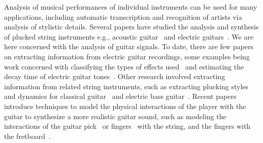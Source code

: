 \documentclass{article}
\begin{document}
Analysis of musical performances of individual instruments can be used for many applications, including automatic transcription and recognition of artists via analysis of stylistic details. Several papers have studied the analysis and synthesis of plucked string instruments e.g., acoustic guitar~\cite{Karjalainen93towardshigh-quality,laurson2001methods} and electric guitars~\cite{sullivan1990extending}. We are here concerned with the analysis of guitar signals. To date, there are few papers on extracting information from electric guitar recordings, some examples being work concerned with classifying the types of effects used~\cite{abesser2012feature} and estimating the decay time of electric guitar tones~\cite{pate2014predicting}. Other research involved extracting information from related string instruments, such as extracting plucking styles and dynamics for classical guitar~\cite{erkut2000extraction} and electric bass guitar~\cite{abesser:automatic_string_detection_ml}. Recent papers introduce techniques to model the physical interactions of the player with the guitar to synthesize a more realistic guitar sound, such as modeling the interactions of the guitar pick~\cite{germain2009synthesis,evangelista2010player} or fingers~\cite{poirot_nonlinear_interactions_with_string} with the string, and the fingers with the fretboard~\cite{bilbao2015numerical}.

\end{document}
